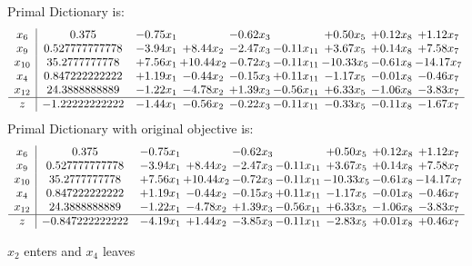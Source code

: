 \documentclass[8pt]{article}
\begin{document}
Primal Dictionary is:
\[\begin{array}{c| c c@{\hskip 2pt} c@{\hskip 2pt} c@{\hskip 2pt} c@{\hskip 2pt} c@{\hskip 2pt} c@{\hskip 2pt} c@{\hskip 2pt} }
 x_{6}   &  0.375 & -0.75 x_{1} &   & -0.62 x_{3} &   & +  0.50 x_{5} & +  0.12 x_{8} & +  1.12 x_{7}\\
 x_{9}   &  0.527777777778 & -3.94 x_{1} & +  8.44 x_{2} & -2.47 x_{3} & -0.11 x_{11} & +  3.67 x_{5} & +  0.14 x_{8} & +  7.58 x_{7}\\
 x_{10}   &  35.2777777778 & +  7.56 x_{1} & + 10.44 x_{2} & -0.72 x_{3} & -0.11 x_{11} & -10.33 x_{5} & -0.61 x_{8} & -14.17 x_{7}\\
 x_{4}   &  0.847222222222 & +  1.19 x_{1} & -0.44 x_{2} & -0.15 x_{3} & +  0.11 x_{11} & -1.17 x_{5} & -0.01 x_{8} & -0.46 x_{7}\\
 x_{12}   &  24.3888888889 & -1.22 x_{1} & -4.78 x_{2} & +  1.39 x_{3} & -0.56 x_{11} & +  6.33 x_{5} & -1.06 x_{8} & -3.83 x_{7}\\
\hline
z    &  -1.22222222222 & -1.44 x_{1} & -0.56 x_{2} & -0.22 x_{3} & -0.11 x_{11} & -0.33 x_{5} & -0.11 x_{8} & -1.67 x_{7}\\
\end{array}\]
Primal Dictionary with original objective is:
\[\begin{array}{c| c c@{\hskip 2pt} c@{\hskip 2pt} c@{\hskip 2pt} c@{\hskip 2pt} c@{\hskip 2pt} c@{\hskip 2pt} c@{\hskip 2pt} }
 x_{6}   &  0.375 & -0.75 x_{1} &   & -0.62 x_{3} &   & +  0.50 x_{5} & +  0.12 x_{8} & +  1.12 x_{7}\\
 x_{9}   &  0.527777777778 & -3.94 x_{1} & +  8.44 x_{2} & -2.47 x_{3} & -0.11 x_{11} & +  3.67 x_{5} & +  0.14 x_{8} & +  7.58 x_{7}\\
 x_{10}   &  35.2777777778 & +  7.56 x_{1} & + 10.44 x_{2} & -0.72 x_{3} & -0.11 x_{11} & -10.33 x_{5} & -0.61 x_{8} & -14.17 x_{7}\\
 x_{4}   &  0.847222222222 & +  1.19 x_{1} & -0.44 x_{2} & -0.15 x_{3} & +  0.11 x_{11} & -1.17 x_{5} & -0.01 x_{8} & -0.46 x_{7}\\
 x_{12}   &  24.3888888889 & -1.22 x_{1} & -4.78 x_{2} & +  1.39 x_{3} & -0.56 x_{11} & +  6.33 x_{5} & -1.06 x_{8} & -3.83 x_{7}\\
\hline
z    &  -0.847222222222 & -4.19 x_{1} & +  1.44 x_{2} & -3.85 x_{3} & -0.11 x_{11} & -2.83 x_{5} & +  0.01 x_{8} & +  0.46 x_{7}\\
\end{array}\]


 $ x_{2} $ enters and $ x_{4} $ leaves 
\end{document}
